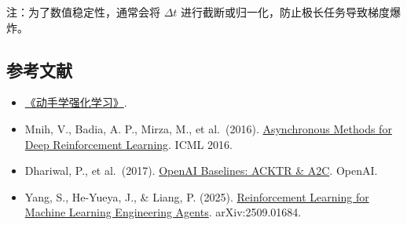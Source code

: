 注：为了数值稳定性，通常会将 \(\Delta t\) 进行截断或归一化，防止极长任务导致梯度爆炸。

\FloatBarrier
{}
\hypertarget{ux53c2ux8003ux6587ux732e-45}{%
\subsection{参考文献}\label{ux53c2ux8003ux6587ux732e-45}}

\vspace{0.25em}
\begin{itemize}
\tightlist
\item
  \href{https://hrl.boyuai.com/}{《动手学强化学习》}.
\item
  Mnih, V., Badia, A. P., Mirza, M., et al.~(2016). \href{https://proceedings.mlr.press/v48/mniha16.html}{Asynchronous Methods for Deep Reinforcement Learning}. ICML 2016.
\item
  Dhariwal, P., et al.~(2017). \href{https://openai.com/index/openai-baselines-acktr-a2c/}{OpenAI Baselines: ACKTR \& A2C}. OpenAI.
\item
  Yang, S., He-Yueya, J., \& Liang, P. (2025). \href{https://arxiv.org/abs/2509.01684}{Reinforcement Learning for Machine Learning Engineering Agents}. arXiv:2509.01684.
\end{itemize}

\clearpage
